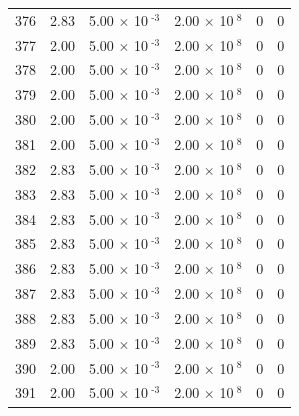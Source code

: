 \documentclass[a4paper,11pt]{article}
\begin{document}
\begin{center}
\begin{longtable}{|R{1.5cm}|R{2.4cm}|R{2.4cm}|R{2.4cm}|R{2.4cm}|R{2.4cm}|}
  376 &   2.83  &         5.00 $\times$ 10$^{\text{          -3}}$  &         2.00 $\times$ 10$^{\text{           8}}$  & 0  & 0 \\
  377 &   2.00  &         5.00 $\times$ 10$^{\text{          -3}}$  &         2.00 $\times$ 10$^{\text{           8}}$  & 0  & 0 \\
  378 &   2.00  &         5.00 $\times$ 10$^{\text{          -3}}$  &         2.00 $\times$ 10$^{\text{           8}}$  & 0  & 0 \\
  379 &   2.00  &         5.00 $\times$ 10$^{\text{          -3}}$  &         2.00 $\times$ 10$^{\text{           8}}$  & 0  & 0 \\
  380 &   2.00  &         5.00 $\times$ 10$^{\text{          -3}}$  &         2.00 $\times$ 10$^{\text{           8}}$  & 0  & 0 \\
  381 &   2.00  &         5.00 $\times$ 10$^{\text{          -3}}$  &         2.00 $\times$ 10$^{\text{           8}}$  & 0  & 0 \\
  382 &   2.83  &         5.00 $\times$ 10$^{\text{          -3}}$  &         2.00 $\times$ 10$^{\text{           8}}$  & 0  & 0 \\
  383 &   2.83  &         5.00 $\times$ 10$^{\text{          -3}}$  &         2.00 $\times$ 10$^{\text{           8}}$  & 0  & 0 \\
  384 &   2.83  &         5.00 $\times$ 10$^{\text{          -3}}$  &         2.00 $\times$ 10$^{\text{           8}}$  & 0  & 0 \\
  385 &   2.83  &         5.00 $\times$ 10$^{\text{          -3}}$  &         2.00 $\times$ 10$^{\text{           8}}$  & 0  & 0 \\
  386 &   2.83  &         5.00 $\times$ 10$^{\text{          -3}}$  &         2.00 $\times$ 10$^{\text{           8}}$  & 0  & 0 \\
  387 &   2.83  &         5.00 $\times$ 10$^{\text{          -3}}$  &         2.00 $\times$ 10$^{\text{           8}}$  & 0  & 0 \\
  388 &   2.83  &         5.00 $\times$ 10$^{\text{          -3}}$  &         2.00 $\times$ 10$^{\text{           8}}$  & 0  & 0 \\
  389 &   2.83  &         5.00 $\times$ 10$^{\text{          -3}}$  &         2.00 $\times$ 10$^{\text{           8}}$  & 0  & 0 \\
  390 &   2.00  &         5.00 $\times$ 10$^{\text{          -3}}$  &         2.00 $\times$ 10$^{\text{           8}}$  & 0  & 0 \\
  391 &   2.00  &         5.00 $\times$ 10$^{\text{          -3}}$  &         2.00 $\times$ 10$^{\text{           8}}$  & 0  & 0 \\

\end{longtable}
\end{center}
\end{document}
